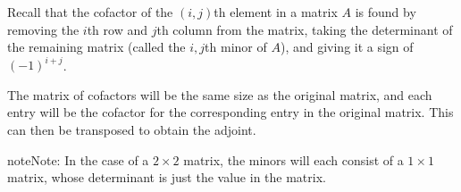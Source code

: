 \documentclass[letterpaper,10pt,english]{jupyterBook}
\begin{document}
\sphinxAtStartPar
Recall that the cofactor of the \((i,j)\)th element in a matrix \(A\) is found by removing the \(i\)th row and \(j\)th column from the matrix, taking the determinant of the remaining matrix (called the \(i,j\)th minor of \(A\)), and giving it a sign of \((-1)^{i+j}\).

\sphinxAtStartPar
The matrix of cofactors will be the same size as the original matrix, and each entry will be the cofactor for the corresponding entry in the original matrix. This can then be transposed to obtain the adjoint.

\begin{sphinxadmonition}{note}{Note:}
\sphinxAtStartPar
In the case of a \(2 \times 2\) matrix, the minors will each consist of a \(1 \times 1\) matrix, whose determinant is just the value in the matrix.
\end{sphinxadmonition}
\label{_pages/1.5_Inverse_matrix:adjoint-example}
\end{document}

